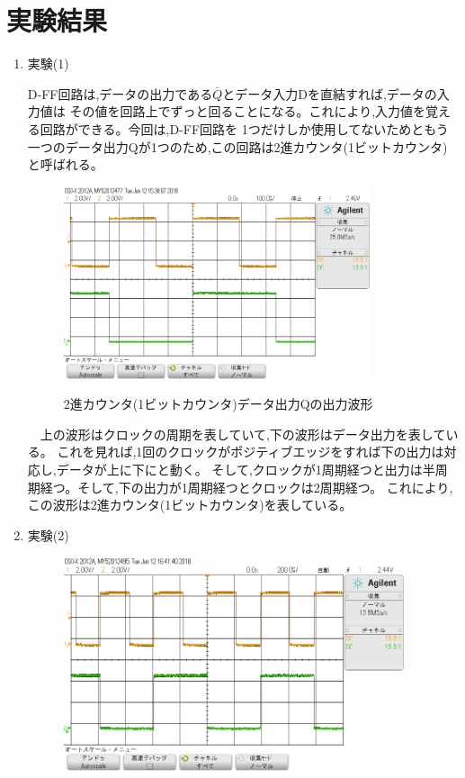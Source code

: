 \documentclass[a4paper,11pt,titlepage]{jarticle}
\begin{document}
\section{実験結果}
\begin{enumerate}
  \item 実験(1) \par
    D-FF回路は,データの出力である$\overline{Q}$とデータ入力Dを直結すれば,データの入力値は
  その値を回路上でずっと回ることになる。これにより,入力値を覚える回路ができる。今回は,D-FF回路を
  1つだけしか使用してないためともう一つのデータ出力Qが1つのため,この回路は2進カウンタ(1ビットカウンタ)
  と呼ばれる。\par
  \begin{figure}[H]
\centering
\includegraphics[width=90mm]{scope_2.png}
\label{sample1}\\
\caption{2進カウンタ(1ビットカウンタ)データ出力Qの出力波形}
\end{figure}
\par
 　上の波形はクロックの周期を表していて,下の波形はデータ出力を表している。
 これを見れば,1回のクロックがポジティブエッジをすれば下の出力は対応し,データが上に下にと動く。
 そして,クロックが1周期経つと出力は半周期経つ。そして,下の出力が1周期経つとクロックは2周期経つ。
 これにより,この波形は2進カウンタ(1ビットカウンタ)を表している。\par
  \item 実験(2) \par
  \begin{figure}[H]
\centering
\includegraphics[width=100mm]{scope_06.png}

\end{figure}
\end{enumerate}
\end{document}
